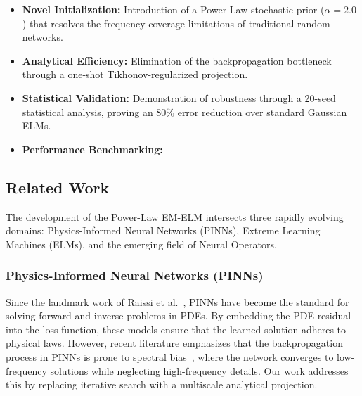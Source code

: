 \documentclass[final,12pt,3p,times,fleqn]{elsarticle}
\begin{document}
\begin{itemize}
    \item \textbf{Novel Initialization:} Introduction of a Power-Law stochastic prior ($\alpha=2.0$) that resolves the frequency-coverage limitations of traditional random networks.
    \item \textbf{Analytical Efficiency:} Elimination of the backpropagation bottleneck through a one-shot Tikhonov-regularized projection.
    \item \textbf{Statistical Validation:} Demonstration of robustness through a 20-seed statistical analysis, proving an $80\%$ error reduction over standard Gaussian ELMs.
    \item \textbf{Performance Benchmarking:} 
\end{itemize}

\subsection{Related Work}

The development of the Power-Law EM-ELM intersects three rapidly evolving domains: Physics-Informed Neural Networks (PINNs), Extreme Learning Machines (ELMs), and the emerging field of Neural Operators.

\subsubsection{Physics-Informed Neural Networks (PINNs)}

Since the landmark work of Raissi et al.~\cite{raissi2019physics}, PINNs have become the standard for solving forward and inverse problems in PDEs. By embedding the PDE residual into the loss function, these models ensure that the learned solution adheres to physical laws. %
However, recent literature emphasizes that the backpropagation process in PINNs is prone to spectral bias~\cite{rahaman2019spectral,basri2020frequency}, where the network converges to low-frequency solutions while neglecting high-frequency details.  Our work addresses this by replacing iterative search with a multiscale analytical projection.
\end{document}
